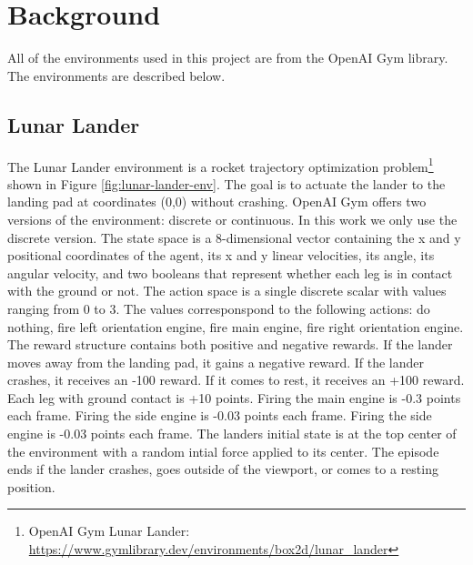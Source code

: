 \section{Background}

All of the environments used in this project are from the OpenAI Gym library\cite{brockman2016openai}. The environments are described below.

\subsection{Lunar Lander}

The Lunar Lander environment is a rocket trajectory optimization
problem\footnote{OpenAI Gym Lunar Lander: \url{https://www.gymlibrary.dev/environments/box2d/lunar_lander}}
shown in Figure \ref{fig:lunar-lander-env}. The goal is to actuate the lander to the landing pad at coordinates (0,0) without crashing.
OpenAI Gym offers two versions of the environment: discrete or continuous.
In this work we only use the discrete version.
The state space is a 8-dimensional vector containing the x and y positional coordinates of the agent, its x and y linear velocities,
its angle, its angular velocity, and two booleans that represent whether each leg is in contact with the ground or not.
The action space is a single discrete scalar with values ranging from 0 to 3. The values corresponspond to the following actions:
do nothing, fire left orientation engine, fire main engine, fire right orientation engine.
The reward structure contains both positive and negative rewards. If the lander moves away from the landing pad, it gains a negative reward.
If the lander crashes, it receives an -100 reward. If it comes to rest, it receives an +100 reward. Each leg with ground contact is +10 points.
Firing the main engine is -0.3 points each frame. Firing the side engine is -0.03 points each frame. Firing the side engine is -0.03 points each frame.
The landers initial state is at the top center of the environment with a random intial force applied to its center.
The episode ends if the lander crashes, goes outside of the viewport, or comes to a resting position.

